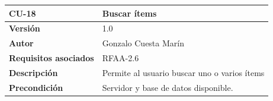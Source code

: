 \documentclass[
]{article}
\begin{document}
\begin{longtable}[]{@{}ll@{}}
\toprule
\begin{minipage}[b]{0.25\columnwidth}\raggedright
\textbf{CU-18}\strut
\end{minipage} & \begin{minipage}[b]{0.69\columnwidth}\raggedright
\textbf{Buscar ítems}\strut
\end{minipage}\tabularnewline
\midrule
\endhead
\begin{minipage}[t]{0.25\columnwidth}\raggedright
\textbf{Versión}\strut
\end{minipage} & \begin{minipage}[t]{0.69\columnwidth}\raggedright
1.0\strut
\end{minipage}\tabularnewline
\begin{minipage}[t]{0.25\columnwidth}\raggedright
\textbf{Autor}\strut
\end{minipage} & \begin{minipage}[t]{0.69\columnwidth}\raggedright
Gonzalo Cuesta Marín\strut
\end{minipage}\tabularnewline
\begin{minipage}[t]{0.25\columnwidth}\raggedright
\textbf{Requisitos asociados}\strut
\end{minipage} & \begin{minipage}[t]{0.69\columnwidth}\raggedright
RFAA-2.6\strut
\end{minipage}\tabularnewline
\begin{minipage}[t]{0.25\columnwidth}\raggedright
\textbf{Descripción}\strut
\end{minipage} & \begin{minipage}[t]{0.69\columnwidth}\raggedright
Permite al usuario buscar uno o varios ítems\strut
\end{minipage}\tabularnewline
\begin{minipage}[t]{0.25\columnwidth}\raggedright
\textbf{Precondición}\strut
\end{minipage} & \begin{minipage}[t]{0.69\columnwidth}\raggedright
Servidor y base de datos disponible.


\end{minipage}
\end{longtable}
\end{document}
